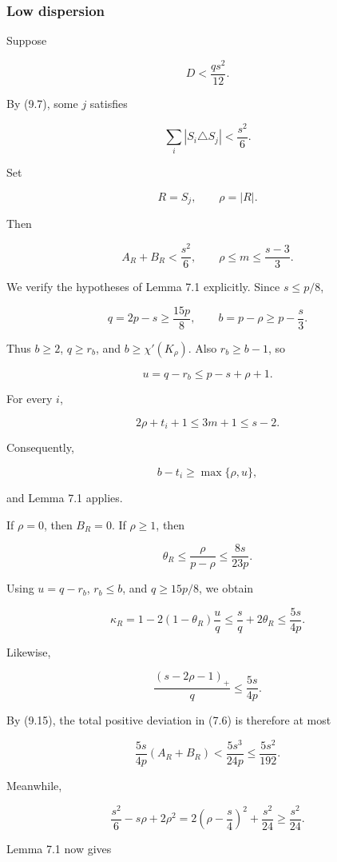 \documentclass[english,11pt,a4paper]{article}
\begin{document}
\subsubsection{Low dispersion}\label{low-dispersion}

Suppose

\[
D<\frac{qs^2}{12}.
\tag{9.13}
\]

By (9.7), some \(j\) satisfies

\[
\sum_i|S_i\triangle S_j|
<
\frac{s^2}{6}.
\tag{9.14}
\]

Set

\[
R=S_j,
\qquad
\rho=|R|.
\]

Then

\[
A_R+B_R<\frac{s^2}{6},
\qquad
\rho\le m\le\frac{s-3}{3}.
\tag{9.15}
\]

We verify the hypotheses of Lemma 7.1 explicitly. Since \(s\le p/8\),

\[
q=2p-s\ge\frac{15p}{8},
\qquad
b=p-\rho\ge p-\frac s3.
\]

Thus \(b\ge2\), \(q\ge r_b\), and \(b\ge\chi'(K_\rho)\). Also
\(r_b\ge b-1\), so

\[
u=q-r_b\le p-s+\rho+1.
\]

For every \(i\),

\[
2\rho+t_i+1
\le
3m+1
\le
s-2.
\]

Consequently,

\[
b-t_i\ge\max\{\rho,u\},
\]

and Lemma 7.1 applies.

If \(\rho=0\), then \(B_R=0\). If \(\rho\ge1\), then

\[
\theta_R
\le
\frac{\rho}{p-\rho}
\le
\frac{8s}{23p}.
\]

Using \(u=q-r_b\), \(r_b\le b\), and \(q\ge15p/8\), we obtain

\[
\kappa_R
=1-2(1-\theta_R)\frac uq
\le
\frac sq+2\theta_R
\le
\frac{5s}{4p}.
\tag{9.16}
\]

Likewise,

\[
\frac{(s-2\rho-1)_+}{q}
\le
\frac{5s}{4p}.
\tag{9.17}
\]

By (9.15), the total positive deviation in (7.6) is therefore at most

\[
\frac{5s}{4p}(A_R+B_R)
<
\frac{5s^3}{24p}
\le
\frac{5s^2}{192}.
\tag{9.18}
\]

Meanwhile,

\[
\frac{s^2}{6}-s\rho+2\rho^2
=
2\left(\rho-\frac s4\right)^2+\frac{s^2}{24}
\ge
\frac{s^2}{24}.
\tag{9.19}
\]

Lemma 7.1 now gives
\end{document}
